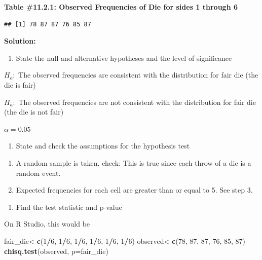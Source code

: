 \documentclass[
]{book}
\newenvironment{Shaded}{\begin{snugshade}}{\end{snugshade}}
\newcommand{\DataTypeTok}[1]{\textcolor[rgb]{0.13,0.29,0.53}{#1}}
\newcommand{\DecValTok}[1]{\textcolor[rgb]{0.00,0.00,0.81}{#1}}
\newcommand{\KeywordTok}[1]{\textcolor[rgb]{0.13,0.29,0.53}{\textbf{#1}}}
\newcommand{\NormalTok}[1]{#1}
\newcommand{\OperatorTok}[1]{\textcolor[rgb]{0.81,0.36,0.00}{\textbf{#1}}}
\providecommand{\tightlist}{%
  \setlength{\itemsep}{0pt}\setlength{\parskip}{0pt}}
\begin{document}
\textbf{Table \#11.2.1: Observed Frequencies of Die for sides 1 through 6}

\begin{verbatim}
## [1] 78 87 87 76 85 87
\end{verbatim}

\textbf{Solution:}

\begin{enumerate}
\def\labelenumi{\arabic{enumi}.}
\tightlist
\item
  State the null and alternative hypotheses and the level of significance
\end{enumerate}

\(H_o:\) The observed frequencies are consistent with the distribution for fair die (the die is fair)

\(H_a:\) The observed frequencies are not consistent with the distribution for fair die (the die is not fair)

\(\alpha=0.05\)

\begin{enumerate}
\def\labelenumi{\arabic{enumi}.}
\setcounter{enumi}{1}
\tightlist
\item
  State and check the assumptions for the hypothesis test
\end{enumerate}

\begin{enumerate}
\def\labelenumi{\alph{enumi}.}
\item
  A random sample is taken. check: This is true since each throw of a die is a random event.
\item
  Expected frequencies for each cell are greater than or equal to 5. See step 3.
\end{enumerate}

\begin{enumerate}
\def\labelenumi{\arabic{enumi}.}
\setcounter{enumi}{2}
\tightlist
\item
  Find the test statistic and p-value
\end{enumerate}

On R Studio, this would be

\begin{Shaded}
\begin{Highlighting}[]
\NormalTok{fair_die<-}\KeywordTok{c}\NormalTok{(}\DecValTok{1}\OperatorTok{/}\DecValTok{6}\NormalTok{, }\DecValTok{1}\OperatorTok{/}\DecValTok{6}\NormalTok{, }\DecValTok{1}\OperatorTok{/}\DecValTok{6}\NormalTok{, }\DecValTok{1}\OperatorTok{/}\DecValTok{6}\NormalTok{, }\DecValTok{1}\OperatorTok{/}\DecValTok{6}\NormalTok{, }\DecValTok{1}\OperatorTok{/}\DecValTok{6}\NormalTok{)}
\NormalTok{observed<-}\KeywordTok{c}\NormalTok{(}\DecValTok{78}\NormalTok{, }\DecValTok{87}\NormalTok{, }\DecValTok{87}\NormalTok{, }\DecValTok{76}\NormalTok{, }\DecValTok{85}\NormalTok{, }\DecValTok{87}\NormalTok{)}
\KeywordTok{chisq.test}\NormalTok{(observed, }\DataTypeTok{p=}\NormalTok{fair_die)}
\end{Highlighting}
\end{Shaded}
\end{document}
